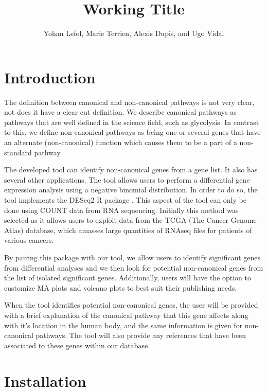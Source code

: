 \documentclass[11pt]{article}
\author{Yohan Lefol, Marie Terrien, Alexis Dupis, and Ugo Vidal}
\title{Working Title}
\begin{document}
\maketitle

\section{Introduction \label{intro}}
The definition between canonical and non-canonical pathways is not very clear, not does it have a clear cut definition.
We describe canonical pathways as pathways that are well defined in the science field, such as glycolysis. In contrast to this, we define non-canonical pathways as being one or several genes that have an alternate (non-canonical) function which causes them to be a part of a non-standard pathway.

The developed tool can identify non-canonical genes from a gene list. It also has several other applications. The tool allows users to perform a differential gene expression analysis using a negative binomial distribution. In order to do so, the tool implements the DESeq2 R package \cite{love2014moderated}. This aspect of the tool can only be done using COUNT data  from RNA sequencing. Initially this method was selected as it allows users to exploit data from the TCGA (The Cancer Genome Atlas) database, which amasses large quantities of RNAseq files for patients of various cancers.

By pairing this package with our tool, we allow users to identify significant genes from differential analyses and we then look for potential non-canonical genes from the list of isolated significant genes. Additionally, users will have the option to customize MA plots and volcano plots to best suit their publishing needs.

When the tool identifies potential non-canonical genes, the user will be provided with a brief explanation of the canonical pathway that this gene affects along with it's location in the human body, and the same information is given for non-canonical pathways. The tool will also provide any references that have been associated to these genes within our database.

\section{Installation \label{installation}}
\end{document}
